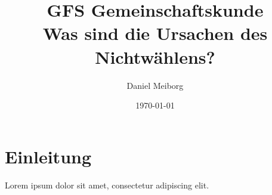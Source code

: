 \documentclass[12pt]{article}
\title{GFS Gemeinschaftskunde \\[1ex] \large Was sind die Ursachen des Nichtwählens?}
\author{Daniel Meiborg}
\date{\today}
\begin{document}
    \maketitle
    \newpage

    \tableofcontents
    \newpage


    \section{Einleitung}
    Lorem ipsum dolor sit amet, consectetur adipiscing elit.


    
    
\end{document}
